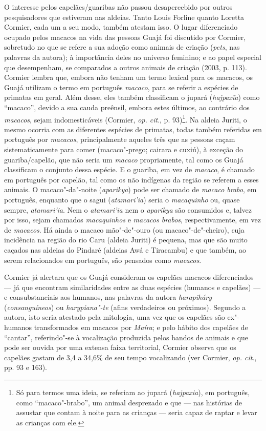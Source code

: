 O interesse pelos capelães/guaribas não passou desapercebido por outros
pesquisadores que estiveram nas aldeias. Tanto Louis Forline quanto
Loretta Cormier, cada um a seu modo, também atestam isso. O lugar
diferenciado ocupado pelos macacos na vida das pessoas Guajá foi
discutido por Cormier, sobretudo no que se refere a sua adoção como
animais de criação (\emph{pets}, nas palavras da autora); à importância
deles no universo feminino; e ao papel especial que desempenham, se
comparados a outros animais de criação (2003, p. 113). Cormier lembra
que, embora não tenham um termo lexical para os macacos, os Guajá
utilizam o termo em português \emph{macaco}, para se referir a espécies
de primatas em geral. Além desse, eles também classificam o jupará
(\emph{hajpaxĩa}) como ``macaco'', devido a sua cauda preênsil, embora
estes últimos, ao contrário dos \emph{macacos}, sejam indomesticáveis
(Cormier, \emph{op. cit}., p. 93)\footnote{Só para termos uma ideia, se
  referiam ao jupará (\emph{hajpaxia}), em português, como
  ``macaco"-brabo'', um animal desprezado e que --- nas histórias de assustar
  que contam à noite para as crianças --- seria capaz de raptar e levar as
  crianças com ele.}. Na aldeia Juriti, o mesmo ocorria com as
diferentes espécies de primatas, todas também referidas em português por
\emph{macacos}, principalmente aqueles três que as pessoas caçam
sistematicamente para comer (macaco"-prego; cairara e cuxiú), à exceção
do guariba/capelão, que não seria um \emph{macaco} propriamente, tal
como os Guajá classificam o conjunto dessa espécie. E o guariba, em vez
de \emph{macaco}, é chamado em português por capelão, tal como os não
indígenas da região se referem a esses animais. O macaco"-da"-noite
(\emph{aparikya}) pode ser chamado de \emph{macaco brabo}, em português,
enquanto que o sagui (\emph{atamari'ia}) seria o \emph{macaquinho} ou,
quase sempre, \emph{atamari'ia}. Nem o \emph{atamari'ia} nem o
\emph{aparikya} são consumidos e, talvez por isso, sejam chamados
\emph{macaquinhos} e \emph{macacos brabos}, respectivamente, em vez de
\emph{macacos}. Há ainda o macaco mão"-de"-ouro (ou macaco"-de"-cheiro),
cuja incidência na região do rio Caru (aldeia Juriti) é pequena, mas que
são muito caçados nas aldeias do Pindaré (aldeias Awá e Tiracambu) e que
também, ao serem relacionados em português, são pensados como
\emph{macacos}.

Cormier já alertara que os Guajá consideram os capelães macacos
diferenciados --- já que encontram similaridades entre as duas espécies
(humanos e capelães) --- e consubstanciais aos humanos, nas palavras da
autora \emph{harapiháry} (\emph{consanguíneos}) ou \emph{harypiana"-te}
(afins verdadeiros ou próximos). Segundo a autora, isto seria atestado
pela mitologia, uma vez que os capelães são ex"-humanos transformados em
macacos por \emph{Maíra}; e pelo hábito dos capelães de ``cantar'',
referindo"-se à vocalização produzida pelos bandos de animais e que pode
ser ouvida por uma extensa faixa territorial, Cormier observa que os
capelães gastam de 3,4 a 34,6\% de seu tempo vocalizando (ver Cormier,
\emph{op. cit}., pp. 93 e 163).

